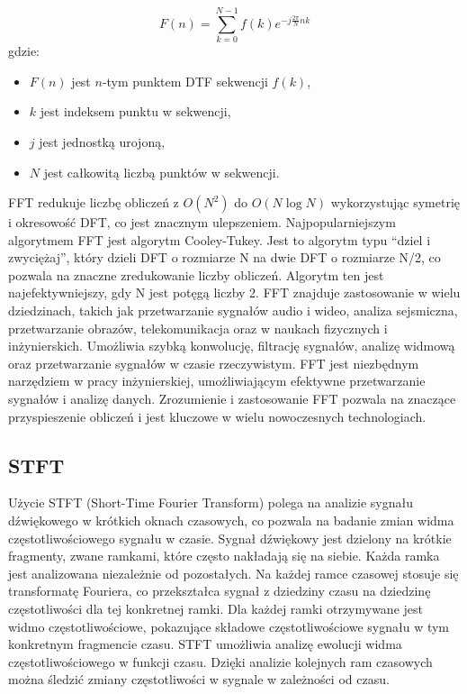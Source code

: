 \begin{equation}
F(n) = \sum_{k=0}^{N-1} f(k) e^{-j\frac{2\pi}{N}nk}
\end{equation}
gdzie:
\begin{itemize}
    \item \(F(n)\) jest \(n\)-tym punktem DTF sekwencji \(f(k)\),
    \item \(k\) jest indeksem punktu w sekwencji,
    \item \(j\) jest jednostką urojoną,
    \item \(N\) jest całkowitą liczbą punktów w sekwencji.
\end{itemize}

FFT redukuje liczbę obliczeń z \(O(N^2)\) do \(O(N \log N)\) wykorzystując symetrię i okresowość DFT, co jest znacznym ulepszeniem.
Najpopularniejszym algorytmem FFT jest algorytm Cooley-Tukey. Jest to algorytm typu “dziel i zwyciężaj”, który dzieli DFT o rozmiarze N na dwie DFT o rozmiarze N/2, co pozwala na znaczne zredukowanie liczby obliczeń. Algorytm ten jest najefektywniejszy, gdy N jest potęgą liczby 2. FFT znajduje zastosowanie w wielu dziedzinach, takich jak przetwarzanie sygnałów audio i wideo, analiza sejsmiczna, przetwarzanie obrazów, telekomunikacja oraz w naukach fizycznych i inżynierskich. Umożliwia szybką konwolucję, filtrację sygnałów, analizę widmową oraz przetwarzanie sygnałów w czasie rzeczywistym. FFT jest niezbędnym narzędziem w pracy inżynierskiej, umożliwiającym efektywne przetwarzanie sygnałów i analizę danych. Zrozumienie i zastosowanie FFT pozwala na znaczące przyspieszenie obliczeń i jest kluczowe w wielu nowoczesnych technologiach.

\subsection{STFT}

Użycie STFT (Short-Time Fourier Transform) polega na analizie sygnału dźwiękowego w krótkich oknach czasowych, co pozwala na badanie zmian widma częstotliwościowego sygnału w czasie. Sygnał dźwiękowy jest dzielony na krótkie fragmenty, zwane ramkami, które często nakładają się na siebie. Każda ramka jest analizowana niezależnie od pozostałych. Na każdej ramce czasowej stosuje się transformatę Fouriera, co przekształca sygnał z dziedziny czasu na dziedzinę częstotliwości dla tej konkretnej ramki. Dla każdej ramki otrzymywane jest widmo częstotliwościowe, pokazujące składowe częstotliwościowe sygnału w tym konkretnym fragmencie czasu. STFT umożliwia analizę ewolucji widma częstotliwościowego w funkcji czasu. Dzięki analizie kolejnych ram czasowych można śledzić zmiany częstotliwości w sygnale w zależności od czasu.\\

